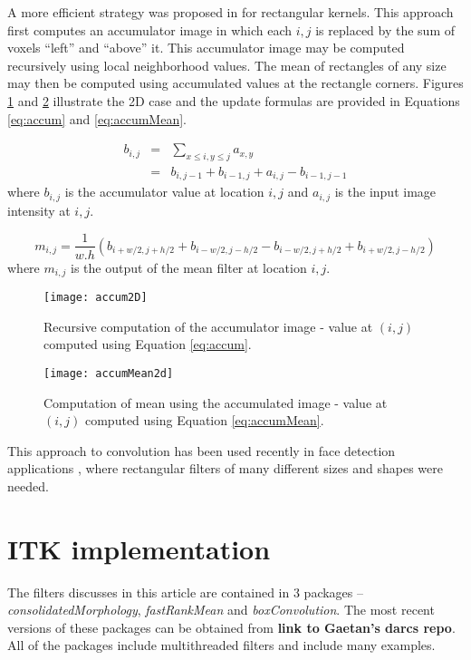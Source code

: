 \documentclass{InsightArticle}
\begin{document}
A more efficient strategy was proposed in \cite{Crow84} for
rectangular kernels. This approach first computes an accumulator image
in which each $i,j$ is replaced by the sum of voxels ``left'' and
``above'' it. This accumulator image may be computed recursively using
local neighborhood values. The mean of rectangles of any size may then
be computed using accumulated values at the rectangle corners. Figures
\ref{fig:accum} and \ref{fig:accumMean} illustrate the 2D case and the
update formulas are provided in Equations \ref{eq:accum} and
\ref{eq:accumMean}.

\begin{eqnarray}
\label{eq:accum}
b_{i,j} & = & \sum_{x \leq i, y \leq j} a_{x,y} \\ \nonumber
	& = & b_{i,j-1} + b_{i-1, j} + a_{i,j} - b_{i-1, j-1}
\end{eqnarray}
where $b_{i,j}$ is the accumulator value at location $i,j$ and $a_{i,j}$ is the input image intensity at $i,j$.

\begin{equation}
\label{eq:accumMean}
m_{i,j} = \frac{1}{w.h} (b_{i+w/2,j+h/2} + b_{i-w/2,j-h/2} - b_{i-w/2,j+h/2} + b_{i+w/2,j-h/2})
\end{equation}
where $m_{i,j}$ is the output of the mean filter at location $i,j$.

\begin{figure}[htbp]
\centering
\texttt{[image: accum2D]}
\caption{Recursive computation of the accumulator image - value at $(i,j)$ computed using Equation \ref{eq:accum}.\label{fig:accum}}
\end{figure}

\begin{figure}[htbp]
\centering
\texttt{[image: accumMean2d]}
\caption{Computation of mean using the accumulated image - value at $(i,j)$ computed using Equation \ref{eq:accumMean}.\label{fig:accumMean}}
\end{figure}

This approach to convolution has been used recently in face detection
applications \cite{Viola2004}, where rectangular filters of many
different sizes and shapes were needed.

\section{ITK implementation}
The filters discusses in this article are contained in 3 packages --
{\em consolidatedMorphology}, {\em fastRankMean} and {\em
boxConvolution}. The most recent versions of these packages can be
obtained from {\bf link to Gaetan's darcs repo}. All of the packages
include multithreaded filters and include many examples.
\end{document}
